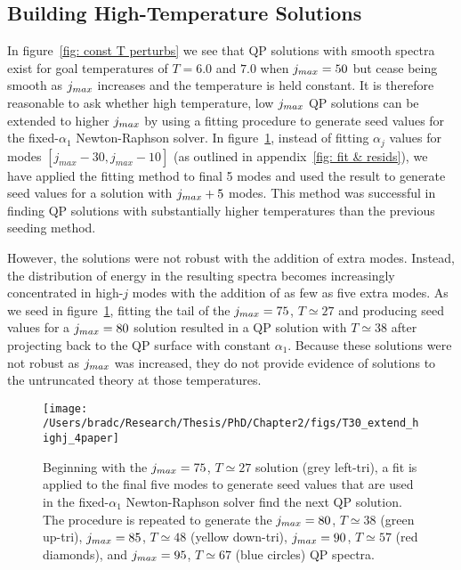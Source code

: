 \documentclass[../PhD.tex]{subfiles}
\begin{document}

\subsection{Building High-Temperature Solutions}
\label{ssec: by hand highT}

In figure~\ref{fig: const T perturbs} we see that QP solutions with smooth spectra exist for goal temperatures of $T=6.0$ and $7.0$ when $j_{max} = 50$ but cease being smooth as $j_{max}$ increases and the temperature is held constant. It is therefore reasonable to ask whether high temperature, low $j_{max}$ QP solutions can be extended to higher $j_{max}$ by using a fitting procedure to generate seed values for the fixed-$\alpha_1$ Newton-Raphson solver. In figure~\ref{fig: manual highT}, instead of fitting $\alpha_j$ values for modes ${[ j_{max} - 30, j_{max} - 10 ]}$ (as outlined in appendix~\ref{fig: fit & resids}), we have applied the fitting method to final 5 modes and used the result to generate seed values for a solution with $j_{max} + 5$ modes. This method was successful in finding QP solutions with substantially higher temperatures than the previous seeding method. 

However, the solutions were not robust with the addition of extra modes. Instead, the distribution of energy in the resulting spectra becomes increasingly concentrated in {high-$j$} modes with the addition of as few as five extra modes. As we seed in figure~\ref{fig: manual highT}, fitting the tail of the $j_{max} = 75$, $T \simeq 27$ and producing seed values for a $j_{max} = 80$ solution resulted in a QP solution with $T \simeq 38$ after projecting back to the QP surface with constant $\alpha_1$. Because these solutions were not robust as $j_{max}$ was increased, they do not provide evidence of solutions to the untruncated theory at those temperatures.

\begin{figure}[ht]
	\centering
	\texttt{[image: /Users/bradc/Research/Thesis/PhD/Chapter2/figs/T30\_extend\_highj\_4paper]}
	\caption[Constructing high temperature solutions by hand]{Beginning with the $j_{max} = 75$, $T \simeq 27$ solution (grey left-tri), a fit is applied to the final five modes to generate seed values that are used in the fixed-$\alpha_1$ Newton-Raphson solver find the next QP solution. The procedure is repeated to generate the $j_{max} = 80$, $T \simeq 38$ (green up-tri), $j_{max} = 85$, $T \simeq 48$ (yellow down-tri), $j_{max} = 90$, $T \simeq 57$ (red diamonds), and $j_{max} = 95$, $T \simeq 67$ (blue circles) QP spectra.}
	\label{fig: manual highT}
\end{figure}
\end{document}
